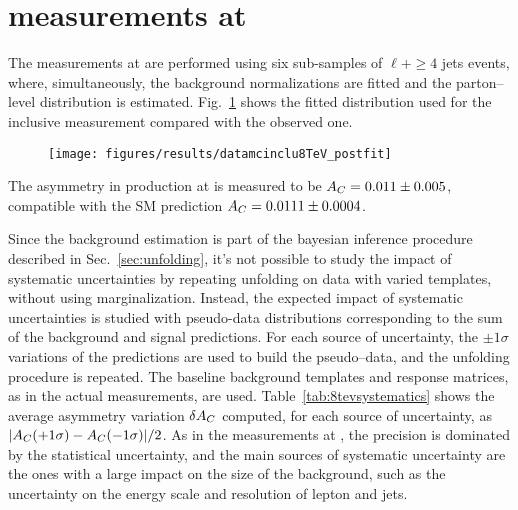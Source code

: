 \section{\ac{} measurements at \eighttev{}}
\label{sec:res8tev}

The measurements at \eighttev{} are performed using six sub-samples of
$\ell{}+\ge4$ jets events, where, simultaneously, the background
normalizations are fitted and the parton--level \dy{} distribution is
estimated. Fig.~\ref{fig:dy7tev} shows the fitted distribution used
for the inclusive \ac{} measurement compared with the observed one. 

\begin{figure}[!htb]\centering
  \texttt{[image: figures/results/datamcinclu8TeV\_postfit]} 
  \caption{}
  \label{fig:dy7tev}
\end{figure}

The asymmetry \ac{} in \ttbar{} production at \eighttev{} is measured to be
$A_C{}= 0.011\pm0.005$, compatible with the SM prediction
$A_C{}=0.0111\pm0.0004$.

Since the background estimation is part of the bayesian inference
procedure described in Sec.~\ref{sec:unfolding}, it's not possible to
study the impact of systematic uncertainties by repeating unfolding on data with
varied templates, without using marginalization. Instead, the expected
impact of systematic uncertainties is studied with pseudo-data distributions
corresponding to the sum of the background and signal predictions.
For each source of uncertainty, the $\pm{}1\sigma$ variations of the
predictions are used to build the pseudo--data, and the unfolding
procedure is repeated. The baseline background templates and response
matrices, as in the actual measurements, are used.
Table~\ref{tab:8tevsystematics} shows the average asymmetry variation
$\delta{\ensuremath{A_C}{}}$ computed, for each source of uncertainty, as
$|A_C{}(+1\sigma)-A_C{}(-1\sigma)|/2$.
As in the measurements at \seventev{}, the precision is dominated by
the statistical uncertainty, and the main sources of systematic
uncertainty are the ones with a large impact on the size of the
\wjets{} background, such as the uncertainty on the energy scale and
resolution of lepton and jets. 


